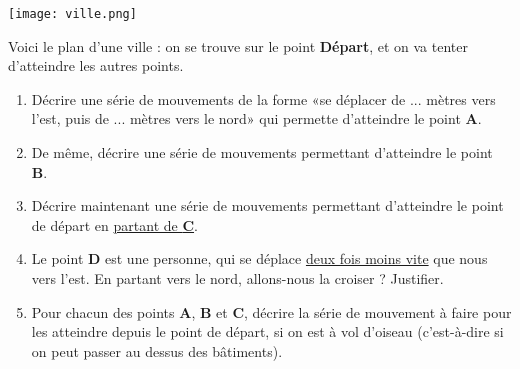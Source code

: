 \documentclass[
	classe=$2^{de}$
	headerTitle=Déplacements\space dans\space une\space ville
]{exercice}
\begin{document}
\begin{center}
	\texttt{[image: ville.png]}
\end{center}



Voici le plan d'une ville : on se trouve sur le point \textbf{Départ}, et on va tenter d'atteindre les autres points.

\newcommand{\spacing}{3.5em}
\begin{enumerate}
	\item Décrire une série de mouvements de la forme «se déplacer de ... mètres vers l'est, puis de ... mètres vers le nord» qui permette d'atteindre le point \textbf{A}. \vspace{\spacing}
	\item De même, décrire une série de mouvements permettant d'atteindre le point \textbf{B}. \vspace{\spacing}
	\item Décrire maintenant une série de mouvements permettant d'atteindre le point de départ en \uline{partant de \textbf{C}}. \vspace{\spacing}
	\item Le point \textbf{D} est une personne, qui se déplace \uline{deux fois moins vite} que nous vers l'est. En partant vers le nord, allons-nous la croiser ? Justifier. \vspace{\spacing}
	\item Pour chacun des points \textbf{A}, \textbf{B} et \textbf{C}, décrire la série de mouvement à faire pour les atteindre depuis le point de départ, si on est à vol d'oiseau (c'est-à-dire si on peut passer au dessus des bâtiments). \vspace{\spacing}
\end{enumerate}
\end{document}
